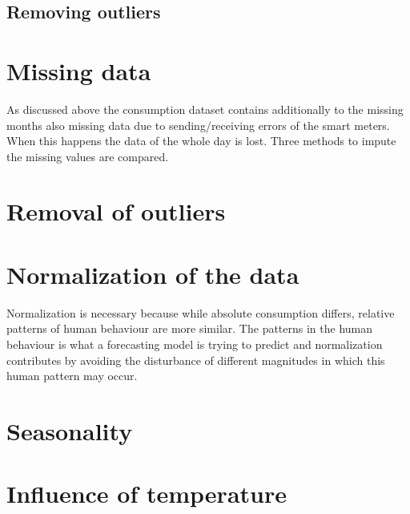 \subsection{Removing outliers}


\section{Missing data} \label{s:missing_data}
As discussed above the consumption dataset contains additionally to the missing months also missing data due to sending/receiving errors of the smart meters. When this happens the data of the whole day is lost. Three methods to impute the missing values are compared. 

\section{Removal of outliers}

\section{Normalization of the data}
Normalization is necessary because while absolute consumption differs, relative patterns of human behaviour are more similar.\cite{Lago2020} The patterns in the human behaviour is what a forecasting model is trying to predict and normalization contributes by avoiding the disturbance of different magnitudes in which this human pattern may occur.    


\section{Seasonality}

\section{Influence of temperature}


